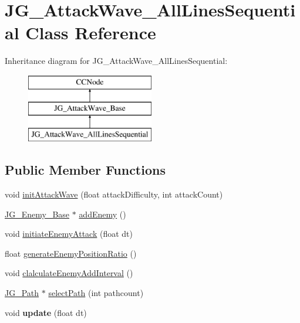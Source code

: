 \hypertarget{class_j_g___attack_wave___all_lines_sequential}{\section{J\-G\-\_\-\-Attack\-Wave\-\_\-\-All\-Lines\-Sequential Class Reference}
\label{class_j_g___attack_wave___all_lines_sequential}
}
Inheritance diagram for J\-G\-\_\-\-Attack\-Wave\-\_\-\-All\-Lines\-Sequential\-:\begin{figure}[H]
\begin{center}
\leavevmode
\includegraphics[height=3.000000cm]{class_j_g___attack_wave___all_lines_sequential}
\end{center}
\end{figure}
\subsection*{Public Member Functions}
\begin{DoxyCompactItemize}
\item 
void \hyperlink{class_j_g___attack_wave___all_lines_sequential_afa40aa5942cf470b18e7f41f3e9b2aef}{init\-Attack\-Wave} (float attack\-Difficulty, int attack\-Count)
\item 
\hyperlink{class_j_g___enemy___base}{J\-G\-\_\-\-Enemy\-\_\-\-Base} $\ast$ \hyperlink{class_j_g___attack_wave___all_lines_sequential_a48903ad7c5af66b52df0f5f56d514304}{add\-Enemy} ()
\item 
void \hyperlink{class_j_g___attack_wave___all_lines_sequential_ab5410d3034fee462c0159fbf3685195b}{initiate\-Enemy\-Attack} (float dt)
\item 
float \hyperlink{class_j_g___attack_wave___all_lines_sequential_ab2582130615e79882a153c2572f207c1}{generate\-Enemy\-Position\-Ratio} ()
\item 
void \hyperlink{class_j_g___attack_wave___all_lines_sequential_a597aa5a56da53c430af263cb409c3898}{clalculate\-Enemy\-Add\-Interval} ()
\item 
\hyperlink{class_j_g___path}{J\-G\-\_\-\-Path} $\ast$ \hyperlink{class_j_g___attack_wave___all_lines_sequential_a9220eda05465a8ec13a12b275230c7ed}{select\-Path} (int pathcount)
\item 
\hypertarget{class_j_g___attack_wave___all_lines_sequential_ad500c16193bfbfd3193daa26ab885739}{void {\bfseries update} (float dt)}\label{class_j_g___attack_wave___all_lines_sequential_ad500c16193bfbfd3193daa26ab885739}

\end{DoxyCompactItemize}
